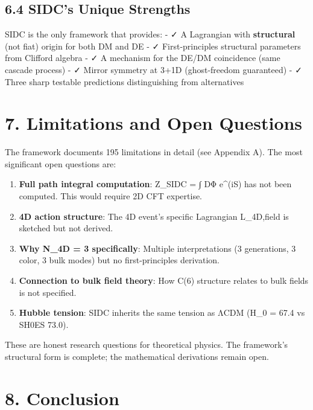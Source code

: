 \documentclass[11pt,a4paper]{article}
\begin{document}
\hypertarget{sidcs-unique-strengths}{%
\subsection{6.4 SIDC's Unique Strengths}\label{sidcs-unique-strengths}}

SIDC is the only framework that provides: - ✓ A Lagrangian with
\textbf{structural} (not fiat) origin for both DM and DE - ✓
First-principles structural parameters from Clifford algebra - ✓ A
mechanism for the DE/DM coincidence (same cascade process) - ✓ Mirror
symmetry at 3+1D (ghost-freedom guaranteed) - ✓ Three sharp testable
predictions distinguishing from alternatives

\hypertarget{limitations-and-open-questions}{%
\section{7. Limitations and Open
Questions}\label{limitations-and-open-questions}}

The framework documents 195 limitations in detail (see Appendix A). The
most significant open questions are:

\begin{enumerate}
\def\labelenumi{\arabic{enumi}.}
\item
  \textbf{Full path integral computation}: Z\_SIDC = ∫ DΦ e\^{}(iS) has
  not been computed. This would require 2D CFT expertise.
\item
  \textbf{4D action structure}: The 4D event's specific Lagrangian
  L\_4D,field is sketched but not derived.
\item
  \textbf{Why N\_4D = 3 specifically}: Multiple interpretations (3
  generations, 3 color, 3 bulk modes) but no first-principles
  derivation.
\item
  \textbf{Connection to bulk field theory}: How C(6) structure relates
  to bulk fields is not specified.
\item
  \textbf{Hubble tension}: SIDC inherits the same tension as ΛCDM (H\_0
  = 67.4 vs SH0ES 73.0).
\end{enumerate}

These are honest research questions for theoretical physics. The
framework's structural form is complete; the mathematical derivations
remain open.

\hypertarget{conclusion}{%
\section{8. Conclusion}\label{conclusion}}
\end{document}
